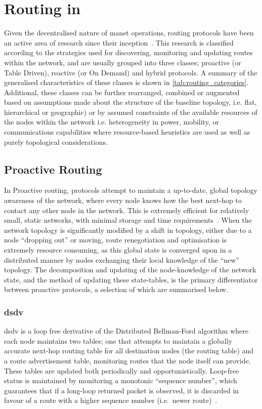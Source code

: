 \section{Routing in }\label{sec:manet_routing}

Given the decentralised nature of \gls{manet} operations, routing protocols have been an active area of research since their inception~\cite{Jubin1987}.
This research is classified according to the strategies used for discovering, monitoring and updating routes within the network, and are usually grouped into three classes; proactive (or Table Driven), reactive (or On Demand) and hybrid protocols.
A summary of the generalised characteristics of these classes is shown in \autoref{tab:routing_categories}.
Additional, these classes can be further rearranged, combined or augmented based on assumptions made about the structure of the baseline topology, i.e. flat, hierarchical or geographic) or by assumed constraints of the available resources of the nodes within the network i.e. heterogeneity in power, mobility, or communications capabilities where resource-based heuristics are used as well as purely topological considerations\cite{Li2005,Gerla2002}.



\subsection{Proactive Routing}

In Proactive routing, protocols attempt to maintain a up-to-date, global topology awareness of the network, where every node knows how the best next-hop to contact any other node in the network.
This is extremely efficient for relatively small, static networks, with minimal storage and time requirements~\cite{Mbarushimana2007}.
When the network topology is significantly modified by a shift in topology, either due to a node ``dropping out'' or moving, route renegotiation and optimisation is extremely resource consuming, as this global state is converged upon in a distributed manner by nodes exchanging their local knowledge of the ``new'' topology.
The decomposition and updating of the node-knowledge of the network state, and the method of updating these state-tables, is the primary differentiator between proactive protocols, a selection of which are summarised below.

\subsubsection{\gls{dsdv}}
\acrlong{dsdv} is a loop free derivative of the Distributed Bellman-Ford algorithm where each node maintains two tables; one that attempts to maintain a globally accurate next-hop routing table for all destination nodes (the routing table) and a route advertisement table, monitoring routes that the node itself can provide. These tables are updated both periodically and opportunistically. Loop-free status is maintained by monitoring a monotonic ``sequence number'', which guarantees that if a long-loop returned packet is observed, it is discarded in favour of a route with a higher sequence number (i.e.\ newer route)~\cite{Perkins1994}.\
